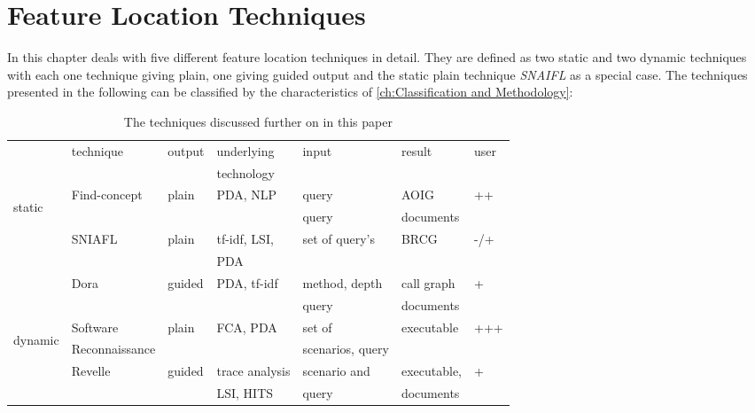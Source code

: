 \chapter{Feature Location Techniques}
\label{ch:feature location techniques}

In this chapter deals with five different feature location techniques in detail. They are defined as two static and two dynamic techniques with each one technique giving plain, one giving guided output and the static plain technique \emph{SNAIFL} as a special case. The techniques presented in the following can be classified by the characteristics of \autoref{ch:Classification and Methodology}:

\begin{table}[h]
	\begin{tabular}{|l| l l l l l l|}
		\hline
		 & technique &  output & underlying & input & result & user \\ 
		 &  &  &  technology &  &  &  \\ \hline
		 \multirow{5}{1em}{\begin{sideways} static \end{sideways}}
		 & Find-concept  & plain & PDA, NLP & query & AOIG & ++  \\
		 &      &        &             & query         & documents  &   \\
		 & SNIAFL & plain & tf-idf, LSI, & set of query's & BRCG & -/+ \\ 
		 &        &       & PDA  &             &      &
		 \\ 
		 & Dora & guided & PDA, tf-idf & method, depth & call graph & + \\ 
		 &      &        &             & query         & documents  &   \\ \hline
		 \multirow{4}{1em}{\begin{sideways} dynamic \end{sideways}}
		 & Software & plain & FCA, PDA & set of & executable & +++ \\ 
		 & Reconnaissance &  &  & scenarios, query & & \\
		 & Revelle  & guided & trace analysis & scenario and & executable, & +\\
		 &   &  & LSI, HITS & query & documents & \\ \hline
		
	\end{tabular}
	\caption{The techniques discussed further on in this paper}
	\label{table:techniques overview}
\end{table}

